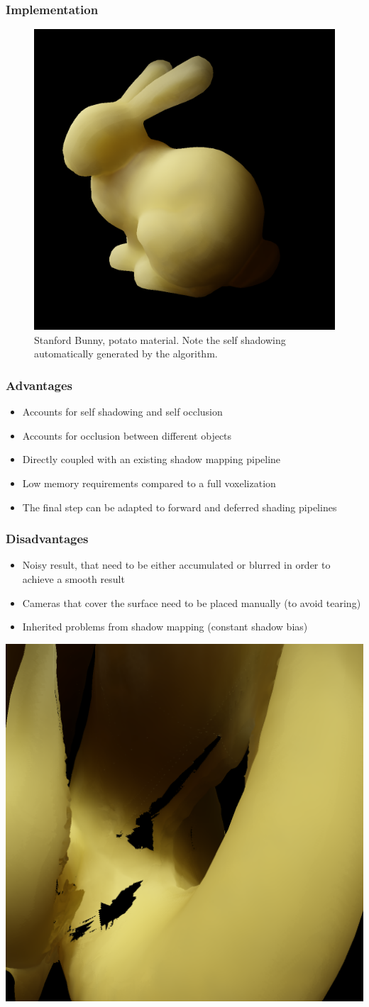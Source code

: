 \documentclass{beamer}
\begin{document}
\begin{frame}
    \frametitle{Implementation}
\begin{figure}
\vspace{0.3cm}
\centering
\includegraphics[width=0.55 \textwidth]{bunny}
\vspace{-0.3cm}
\caption{Stanford Bunny, potato material. Note the self shadowing automatically generated by the algorithm.}
\end{figure}
\end{frame}

\begin{frame}
    \frametitle{Advantages}
\begin{itemize}
	\item Accounts for self shadowing and self occlusion
	\item Accounts for occlusion between different objects
	\item Directly coupled with an existing shadow mapping pipeline
	\item Low memory requirements compared to a full voxelization
	\item The final step can be adapted to forward and deferred shading pipelines
\end{itemize}
\end{frame}


\begin{frame}
    \frametitle{Disadvantages}
\begin{itemize}
	\item Noisy result, that need to be either accumulated or blurred in order to achieve a smooth result
	\item Cameras that cover the surface need to be placed manually (to avoid tearing)
	\item Inherited problems from shadow mapping (constant shadow bias)
\end{itemize}
	\centering
	\includegraphics[width=0.3 \textwidth]{tearing}
\end{frame}
\end{document}
